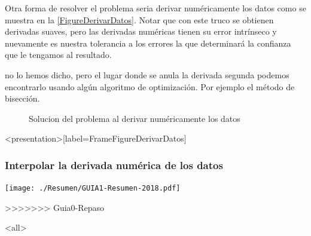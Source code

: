 Otra forma de resolver el problema seria derivar numéricamente los datos
como  se muestra en la \autoref{FigureDerivarDatos}. Notar que con 
este truco se obtienen derivadas suaves, pero las derivadas 
numéricas tienen su error intrínseco y nuevamente es nuestra
tolerancia a los errores la que determinará la confianza que le 
tengamos al resultado. 

no lo hemos dicho, pero el lugar donde se anula la derivada 
segunda podemos encontrarlo usando algún algoritmo 
de optimización. Por ejemplo el método de bisección. 

\begin{figure}
  \caption{\protect\label{FigureDerivarDatos} Solucion del problema al
  derivar numéricamente los datos}
\end{figure}

\mode*
\begin{frame}<presentation>[label=FrameFigureDerivarDatos]
  \frametitle{Interpolar la derivada numérica de los datos}
  \center
  \texttt{[image: ./Resumen/GUIA1-Resumen-2018.pdf]}
\end{frame}
>>>>>>> Guia0-Repaso

\mode*
 
\mode<all>

